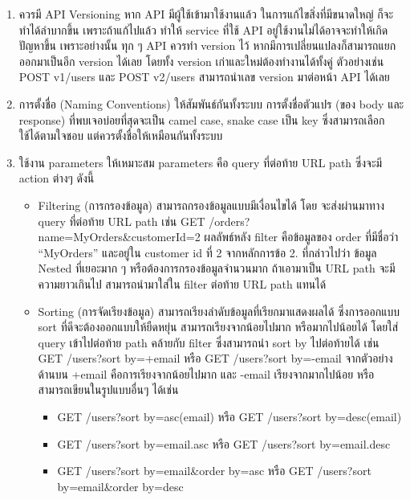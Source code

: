\documentclass[14pt,oneside,openright,a4paper]{cpe-thai-project}
\begin{document}
\begin{enumerate}
        \item ควรมี API Versioning
              หาก API มีผู้ใช้เข้ามาใช้งานแล้ว ในการแก้ไขสิ่งที่มีขนาดใหญ่ ก็จะทำได้ลำบากขึ้น เพราะถ้าแก้ไปแล้ว ทำให้ service ที่ใช้ API อยู่ใช้งานไม่ได้อาจจะทำให้เกิดปัญหาขึ้น เพราะอย่างนั้น ทุก ๆ API ควรทำ version ไว้ หากมีการเปลี่ยนแปลงก็สามารถแยกออกมาเป็นอีก version ได้เลย โดยทั้ง version เก่าและใหม่ต้องทำงานได้ทั้งคู่ ตัวอย่างเช่น
              POST v1/users และ POST v2/users สามารถนำเลข version มาต่อหน้า API ได้เลย

        \item การตั้งชื่อ (Naming Conventions) ให้สัมพันธ์กันทั้งระบบ
              การตั้งชื่อตัวแปร (ของ body และ response) ที่พบเจอบ่อยที่สุดจะเป็น camel case, snake case เป็น key ซึ่งสามารถเลือกใช้ได้ตามใจชอบ แต่ควรตั้งชื่อให้เหมือนกันทั้งระบบ

        \item ใช้งาน parameters ให้เหมาะสม parameters คือ query ที่ต่อท้าย URL path ซึ่งจะมี action ต่างๆ ดังนี้
          \begin{itemize}
            \item Filtering (การกรองข้อมูล) สามารถกรองข้อมูลแบบมีเงื่อนไขได้ โดย จะส่งผ่านมาทาง query ที่ต่อท้าย URL path เช่น GET /orders?name=MyOrders\&customerId=2
                  ผลลัพธ์หลัง filter คือข้อมูลของ order ที่มีชื่อว่า “MyOrders” และอยู่ใน customer id ที่ 2 จากหลักการข้อ 2. ที่กล่าวไปว่า ข้อมูล Nested ที่เยอะมาก ๆ หรือต้องการกรองข้อมูลจำนวนมาก ถ้าเอามาเป็น URL path จะมีความยาวเกินไป สามารถนำมาใส่ใน filter ต่อท้าย URL path แทนได้
            \item Sorting (การจัดเรียงข้อมูล) สามารถเรียงลำดับข้อมูลที่เรียกมาแสดงผลได้ ซึ่งการออกแบบ sort ที่ดีจะต้องออกแบบให้ยืดหยุ่น สามารถเรียงจากน้อยไปมาก หรือมากไปน้อยได้ โดยใส่ query เข้าไปต่อท้าย path คล้ายกับ filter ซึ่งสามารถนำ sort by ไปต่อท้ายได้ เช่น
                  GET /users?sort by=+email หรือ GET /users?sort by=-email จากตัวอย่างด้านบน +email คือการเรียงจากน้อยไปมาก และ -email เรียงจากมากไปน้อย หรือสามารถเขียนในรูปแบบอื่นๆ ได้เช่น
                  \begin{itemize} 
                    \item GET /users?sort by=asc(email) หรือ GET /users?sort by=desc(email)
                    \item GET /users?sort by=email.asc หรือ GET /users?sort by=email.desc
                    \item GET /users?sort by=email\&order by=asc หรือ GET /users?sort by=email\&order by=desc
                  \end{itemize}


\end{itemize}
\end{enumerate}
\end{document}
